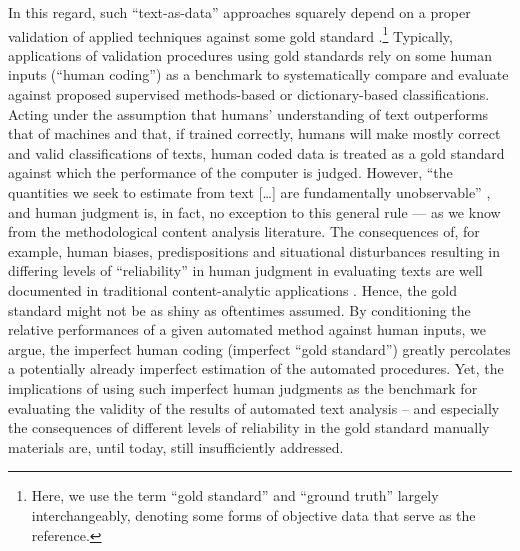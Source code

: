 \documentclass[man, 12pt, a4paper, nolmodern, noextraspace]{apa6}
\begin{document}
    In this regard, such \enquote{text-as-data} approaches squarely depend on a proper validation of applied techniques against some gold standard \parencite{grimmer2013text}.\footnote{Here, we use the term \enquote{gold standard} and \enquote{ground truth} largely interchangeably, denoting some forms of objective data that serve as the reference.} Typically, applications of validation procedures using gold standards rely on some human inputs (\enquote{human coding}) as a  benchmark to systematically compare and evaluate against proposed supervised methods-based or dictionary-based classifications. Acting under the assumption that humans’ understanding of text outperforms that of machines and that, if trained correctly, humans will make mostly correct and valid classifications of texts, human coded data is treated as a gold standard against which the performance of the computer is judged. However, “the quantities we seek to estimate from text [\ldots] are fundamentally unobservable” \parencite[p. 299]{lowe2013validating}, and human judgment is, in fact, no exception to this general rule --- as we know from the methodological content analysis literature. The consequences of, for example, human biases, predispositions and situational disturbances resulting in differing levels of “reliability” in human judgment in evaluating texts are well documented in traditional content-analytic applications \parencite[e.g.,][]{krippendorff2004reliability, hayes2007answering, lombard2002content, ennser2018impact}. Hence, the gold standard might not be as shiny as oftentimes assumed. By conditioning the relative performances of a given automated method against human inputs, we argue, the imperfect human coding (imperfect “gold standard”) greatly percolates a potentially already imperfect estimation of the automated procedures. Yet, the implications of using such imperfect human judgments as the benchmark for evaluating the validity of the results of automated text analysis – and especially the consequences of different levels of reliability in the gold standard manually materials are, until today, still insufficiently addressed.
    
\end{document}
